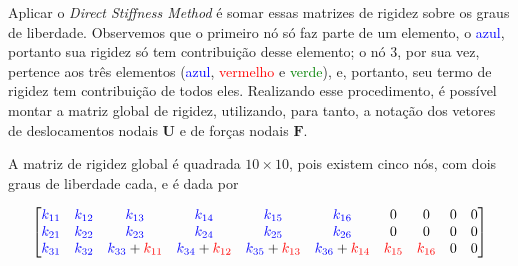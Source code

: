 Aplicar o \emph{Direct Stiffness Method} é somar essas matrizes de rigidez sobre os graus de liberdade. Observemos que o primeiro nó só faz parte de um elemento, o \textcolor{blue}{azul}, portanto sua rigidez só tem contribuição desse elemento; o nó $3$, por sua vez, pertence aos três elementos (\textcolor{blue}{azul}, \textcolor{red}{vermelho} e \textcolor{green}{verde}), e, portanto, seu termo de rigidez tem contribuição de todos eles. Realizando esse procedimento, é possível montar a matriz global de rigidez, utilizando, para tanto, a notação dos vetores de deslocamentos nodais $\bm{U}$ e de forças nodais $\bm{F}$.

A matriz de rigidez global é quadrada $10 \times 10$, pois existem cinco nós, com dois graus de liberdade cada, e é dada por
\begin{landscape}
    \begin{equation}
            \begin{bmatrix}
                \textcolor{blue}{k_{11}} &  \textcolor{blue}{k_{12}} &  \textcolor{blue}{k_{13}}                           &  \textcolor{blue}{k_{14}}                             &  \textcolor{blue}{k_{15}}                                                       &  \textcolor{blue}{k_{16}}                                                       & 0                                                    & 0                                                    & 0                          & 0                          \\
                \textcolor{blue}{k_{21}} &  \textcolor{blue}{k_{22}} &  \textcolor{blue}{k_{23}}                           &  \textcolor{blue}{k_{24}}                             &  \textcolor{blue}{k_{25}}                                                       &  \textcolor{blue}{k_{26}}                                                       & 0                                                    & 0                                                    & 0                          & 0                          \\
                \textcolor{blue}{k_{31}} &  \textcolor{blue}{k_{32}} &  \textcolor{blue}{k_{33}} + \textcolor{red}{k_{11}} &  \textcolor{blue}{k_{34}} + \textcolor{red}{k_{12}}   &  \textcolor{blue}{k_{35}} + \textcolor{red}{k_{13}}                             &  \textcolor{blue}{k_{36}} + \textcolor{red}{k_{14}}                             &  \textcolor{red}{k_{15}}                             &  \textcolor{red}{k_{16}}                             & 0                          & 0                          \\

\end{bmatrix}
\end{equation}
\end{landscape}
